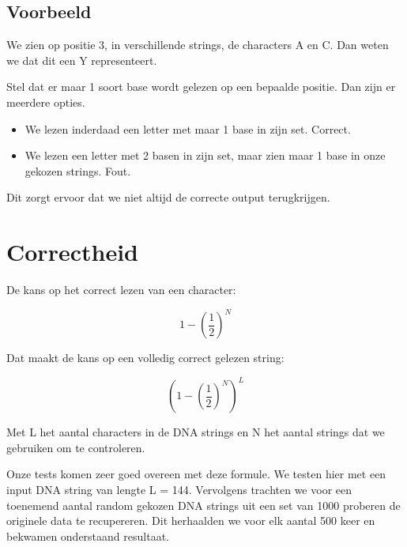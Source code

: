 \documentclass{esannV2}
\begin{document}
\subsection*{Voorbeeld}
 We zien op positie 3, in verschillende strings, de characters A en C. Dan weten we dat dit een Y representeert.

Stel dat er maar 1 soort base wordt gelezen op een bepaalde positie. Dan zijn er meerdere opties. 

\begin{itemize}
	\item We lezen inderdaad een letter met maar 1 base in zijn set. Correct.
	\item We lezen een letter met 2 basen in zijn set, maar zien maar 1 base in onze gekozen strings. Fout. 
\end{itemize}

Dit zorgt ervoor dat we niet altijd de correcte output terugkrijgen. 

\newpage
\section{Correctheid}
De kans op het correct lezen van een character:

$$1-\left(\frac{1}{2}\right)^{N}$$

\newline
Dat maakt de kans op een volledig correct gelezen string:

$$\left(1-\left(\frac{1}{2}\right)^{N}\right)^L$$

Met L het aantal characters in de DNA strings en N het aantal strings dat we gebruiken om te controleren.

Onze tests komen zeer goed overeen met deze formule. 
We testen hier met een input DNA string van lengte L = 144. Vervolgens trachten we voor een toenemend aantal random gekozen DNA strings uit een set van 1000 proberen de originele data te recupereren. Dit herhaalden we voor elk aantal 500 keer en bekwamen onderstaand resultaat.
\newline
\end{document}
